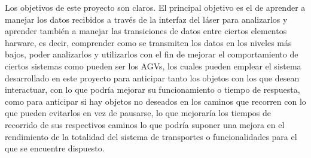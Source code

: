 
Los objetivos de este proyecto son claros. El principal objetivo es el de aprender a manejar los datos recibidos a través de la interfaz del láser para analizarlos y aprender también a manejar las transiciones de datos entre ciertos elementos harware, es decir, comprender como se transmiten los datos en los niveles más bajos, poder analizarlos y utilizarlos con el fin de mejorar el comportamiento de ciertos sistemas como pueden ser los AGVs, los cuales pueden emplear el sistema desarrollado en este proyecto para anticipar tanto los objetos con los que desean interactuar, con lo que podría mejorar su funcionamiento o tiempo de respuesta, como para anticipar si hay objetos no deseados en los caminos que recorren con lo que pueden evitarlos en vez de pausarse, lo que mejoraría los tiempos de recorrido de sus respectivos caminos lo que podría suponer una mejora en el rendimiento de la totalidad del sistema de transportes o funcionalidades para el que se encuentre dispuesto.